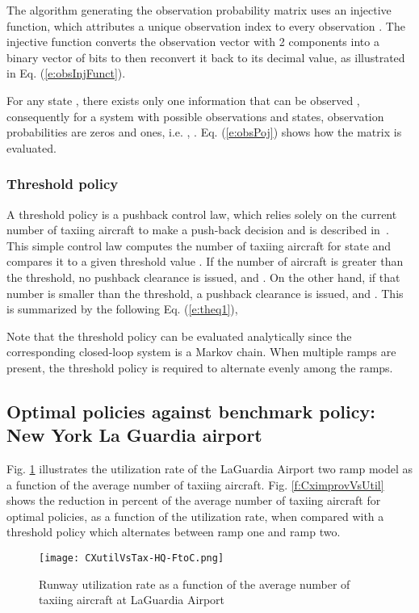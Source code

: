 \documentclass[letterpaper]{article}
\begin{document}
The algorithm generating the observation probability matrix uses an injective function,
 which attributes a unique observation index  to every observation . 
 The injective function converts the observation vector with 2 components into a binary vector of  bits to then reconvert it back to its decimal value, as illustrated in Eq. (\ref{e:obsInjFunct}).



For any state , there exists only one information that can be observed , consequently for a system with  possible observations and  states, observation probabilities are zeros and ones, i.e. , . Eq. (\ref{e:obsPoj}) shows how the  matrix is evaluated.





\subsubsection{Threshold policy}
A threshold policy is a pushback control law, which relies solely on the current number of taxiing aircraft to make a push-back decision and is described in~\cite{log99,SKB:11}.
 This simple control law computes the number of taxiing aircraft   for state  and compares it to a given threshold value  \cite{log99}.
  If the number of aircraft is greater than the threshold, no pushback clearance is issued, and . On the other hand, if that number is smaller 
  than the threshold, a pushback clearance is issued, and . This is summarized by the following Eq. (\ref{e:theq1}),





Note that the threshold policy can be evaluated analytically since the corresponding closed-loop system is a Markov chain. When multiple ramps are present, the threshold policy is required to alternate evenly among the ramps.

\subsection{Optimal policies against benchmark policy: New York La Guardia airport}

Fig. \ref{f:CXutilVsTax} illustrates the utilization rate of the LaGuardia Airport two ramp model 
as a function of the average number of taxiing aircraft. 
Fig. \ref{f:CximprovVsUtil} shows the reduction in percent of the average number of taxiing aircraft for optimal policies, 
as a function of the utilization rate,
when compared with a threshold policy which alternates between ramp one and ramp two.
\begin{figure}[ht]\hspace{-5mm}
\texttt{[image: CXutilVsTax-HQ-FtoC.png]}
\caption{Runway utilization rate as a function of the average number of taxiing aircraft at LaGuardia Airport}
\label{f:CXutilVsTax}
\end{figure}
\end{document}
